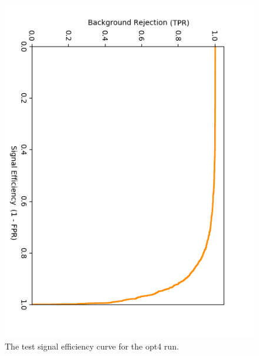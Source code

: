 \begin{figure}[ht] 
        \centering \includegraphics[width=\columnwidth]{figures/crabrun2opt4_sigeff.png}

        \caption{
                \label{fig:opt4_sigeff} The test signal efficiency curve for the opt4 run.
        }
\end{figure}

